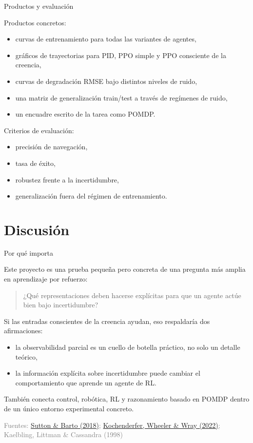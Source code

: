 \documentclass[11pt]{beamer}
\newcommand{\srcSuttonBarto}{\href{http://incompleteideas.net/book/the-book.html}{Sutton \& Barto (2018)}}
\newcommand{\srcKochenderferADM}{\href{https://algorithmsbook.com}{Kochenderfer, Wheeler \& Wray (2022)}}
\newcommand{\srcKaelbling}{Kaelbling, Littman \& Cassandra (1998)}
\newcommand{\SourceLine}[1]{\vfill{\tiny\textcolor{gray}{Fuentes: #1}}}
\begin{document}

\begin{frame}{Productos y evaluación}

Productos concretos:
\begin{itemize}
  \item curvas de entrenamiento para todas las variantes de agentes,
  \item gráficos de trayectorias para PID, PPO simple y PPO consciente de la creencia,
  \item curvas de degradación RMSE bajo distintos niveles de ruido,
  \item una matriz de generalización train/test a través de regímenes de ruido,
  \item un encuadre escrito de la tarea como POMDP.
\end{itemize}

\medskip
Criterios de evaluación:
\begin{itemize}
  \item precisión de navegación,
  \item tasa de éxito,
  \item robustez frente a la incertidumbre,
  \item generalización fuera del régimen de entrenamiento.
\end{itemize}
\end{frame}


\section{Discusión}


\begin{frame}{Por qué importa}

Este proyecto es una prueba pequeña pero concreta de una pregunta más amplia en aprendizaje por refuerzo:

\medskip
\begin{quote}
¿Qué representaciones deben hacerse explícitas para que un agente actúe bien bajo incertidumbre?
\end{quote}

\medskip
Si las entradas conscientes de la creencia ayudan, eso respaldaría dos afirmaciones:
\begin{itemize}
  \item la observabilidad parcial es un cuello de botella práctico, no solo un detalle teórico,
  \item la información explícita sobre incertidumbre puede cambiar el comportamiento que aprende un agente de RL.
\end{itemize}

También conecta control, robótica, RL y razonamiento basado en POMDP dentro de un único entorno experimental concreto.

\SourceLine{\srcSuttonBarto; \srcKochenderferADM; \srcKaelbling}
\end{frame}
\end{document}
